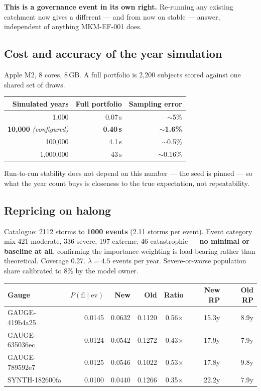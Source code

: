 \documentclass[11pt]{article}
\begin{document}
\textbf{This is a governance event in its own right.} Re-running any existing
catchment now gives a different --- and from now on stable --- answer,
independent of anything MKM-EF-001 does.

\subsection{Cost and accuracy of the year simulation}

Apple M2, 8 cores, 8\,GB. A full portfolio is 2,200 subjects scored against one
shared set of draws.

\begin{center}
\begin{tabular}{@{}rrr@{}}
\toprule
\textbf{Simulated years} & \textbf{Full portfolio} & \textbf{Sampling error} \\
\midrule
1,000 & 0.07\,s & $\sim$5\% \\
\textbf{10,000} \emph{(configured)} & \textbf{0.40\,s} & \textbf{$\sim$1.6\%} \\
100,000 & 4.1\,s & $\sim$0.5\% \\
1,000,000 & 43\,s & $\sim$0.16\% \\
\bottomrule
\end{tabular}
\end{center}

\noindent Run-to-run stability does not depend on this number --- the seed is
pinned --- so what the year count buys is closeness to the true expectation, not
repeatability.

\subsection{Repricing on halong}

Catalogue: 2112 storms to \textbf{1000 events} (2.11 storms per event). Event
category mix 421 moderate, 336 severe, 197 extreme, 46 catastrophic ---
\textbf{no minimal or baseline at all}, confirming the importance-weighting is
load-bearing rather than theoretical. Coverage 0.27. $\lambda = 4.5$ events per
year. Severe-or-worse population share calibrated to 8\% by the model owner.

\begin{center}
\begin{tabular}{@{}lrrrrrr@{}}
\toprule
\textbf{Gauge} & $P(\text{fl}\mid\text{ev})$ & \textbf{New} & \textbf{Old} & \textbf{Ratio} & \textbf{New RP} & \textbf{Old RP} \\
\midrule
GAUGE-419b4a25 & 0.0145 & 0.0632 & 0.1120 & 0.56$\times$ & 15.3y & 8.9y \\
GAUGE-635036ec & 0.0124 & 0.0542 & 0.1272 & 0.43$\times$ & 17.9y & 7.9y \\
GAUGE-789592e7 & 0.0125 & 0.0546 & 0.1022 & 0.53$\times$ & 17.8y & 9.8y \\
SYNTH-182600fa & 0.0100 & 0.0440 & 0.1266 & 0.35$\times$ & 22.2y & 7.9y \\
\bottomrule
\end{tabular}
\end{center}
\end{document}
